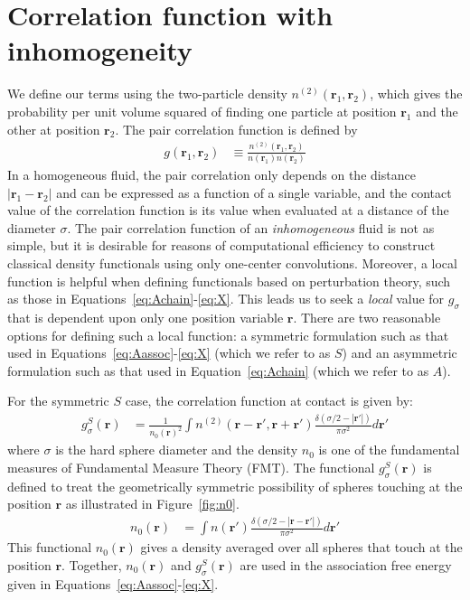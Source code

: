 \documentclass[letterpaper,twocolumn,amsmath,amssymb,pre]{revtex4-1}
\newcommand{\rr}{\textbf{r}}
\begin{document}
\section{Correlation function with inhomogeneity}

We define our terms using the two-particle density
$n^{(2)}(\rr_1,\rr_2)$, which gives the probability per unit volume
squared of finding one particle at position $\rr_1$ and the other at
position $\rr_2$.  The pair correlation function is defined by
\begin{align}
  g(\rr_1,\rr_2) &\equiv \frac{n^{(2)}(\rr_1,\rr_2)}{n(\rr_1)n(\rr_2)}
\end{align}
In a homogeneous fluid, the pair correlation only depends on the
distance $|\rr_1-\rr_2|$ and can be expressed as a function of a
single variable, and the contact value of the correlation function is
its value when evaluated at a distance of the diameter $\sigma$.  The
pair correlation function of an \emph{inhomogeneous} fluid is not as
simple, but it is desirable for reasons of computational efficiency to
construct classical density functionals using only one-center
convolutions.  Moreover, a local function is helpful when defining
functionals based on perturbation theory, such as those in
Equations~\ref{eq:Achain}-\ref{eq:X}.  This leads
us to seek a \emph{local} value for $g_\sigma$ that is dependent upon
only one position variable $\rr$.  There are two reasonable options
for defining such a local function: a symmetric formulation such as
that used in Equations~\ref{eq:Aassoc}-\ref{eq:X} (which we refer to
as $S$) and an asymmetric formulation such as that used in
Equation~\ref{eq:Achain} (which we refer to as $A$).

For the symmetric $S$ case, the correlation function at contact is
given by:
\begin{align}
  g^S_\sigma(\rr) &= \frac{1}{n_0(\rr)^2}\int n^{(2)}(\rr - \rr', \rr
  + \rr')
  \frac{\delta(\sigma/2 -|\rr'|)}{\pi\sigma^2}d\rr' \label{eq:gS}
\end{align}
where $\sigma$ is the hard sphere diameter and the density $n_0$ is one of
the fundamental measures of Fundamental Measure Theory (FMT).  The
functional $g^S_\sigma(\rr)$ is defined to treat the geometrically
symmetric possibility of spheres touching at the position $\rr$ as
illustrated in Figure~\ref{fig:n0}.
\begin{align}
  n_0(\rr) &= \int n(\rr')\frac{\delta(\sigma/2 -|\rr-\rr'|)}{\pi\sigma^2} d\rr'
  \label{eq:n0}
\end{align}
This functional $n_0(\rr)$ gives a density averaged over all spheres that touch at
the position $\rr$.  Together, $n_0(\rr)$ and $g_\sigma^S(\rr)$ are
used in the association free energy given in Equations~\ref{eq:Aassoc}-\ref{eq:X}.
\end{document}
